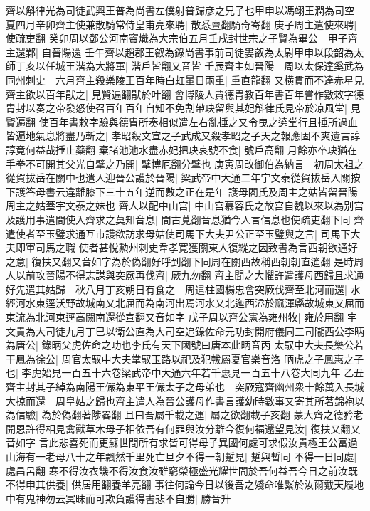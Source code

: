 齊以斛律光為司徒武興王普為尚書左僕射普歸彦之兄子也甲申以馮翊王潤為司空　夏四月辛卯齊主使兼散騎常侍皇甫亮來聘|{
	散悉亶翻騎奇寄翻}
庚子周主遣使來聘|{
	使疏吏翻}
癸卯周以鄧公河南竇熾為大宗伯五月壬戌封世宗之子賢為畢公　甲子齊主還鄴|{
	自晉陽還}
壬午齊以趙郡王叡為錄尚書事前司徒婁叡為太尉甲申以段韶為太師丁亥以任城王湝為大將軍|{
	湝戶皆翻又音皆}
壬辰齊主如晉陽　周以太保達奚武為同州刺史　六月齊主殺樂陵王百年時白虹暈日兩重|{
	重直龍翻}
又横貫而不達赤星見齊主欲以百年猒之|{
	見賢遍翻猒於叶翻}
會博陵人賈德胄教百年書百年嘗作數敕字德胄封以奏之帝發怒使召百年百年自知不免割帶玦留與其妃斛律氏見帝於凉風堂|{
	見賢遍翻}
使百年書敕字驗與德胄所奏相似遣左右亂捶之又令曳之遶堂行且捶所過血皆遍地氣息將盡乃斬之|{
	孝昭殺文宣之子武成又殺孝昭之子天之報應固不爽遺言諄諄竟何益哉捶止蘂翻}
棄諸池池水盡赤妃把玦哀號不食|{
	號戶高翻}
月餘亦卒玦猶在手拳不可開其父光自擘之乃開|{
	擘博厄翻分擘也}
庚寅周改御伯為納言　初周太祖之從賀拔岳在關中也遣人迎晉公護於晉陽|{
	梁武帝中大通二年宇文泰從賀拔岳入關按下護答母書云違離膝下三十五年逆而數之正在是年}
護母閻氏及周主之姑皆留晉陽|{
	周主之姑蓋宇文泰之妹也}
齊人以配中山宫|{
	中山宫慕容氏之故宫自魏以來以為别宫}
及護用事遣間使入齊求之莫知音息|{
	間古莧翻音息猶今人言信息也使疏吏翻下同}
齊遣使者至玉璧求通互市護欲訪求母姑使司馬下大夫尹公正至玉璧與之言|{
	司馬下大夫即軍司馬之職}
使者甚悅勲州刺史韋孝寛獲關東人復縱之因致書為言西朝欲通好之意|{
	復扶又翻又音如字為於偽翻好呼到翻下同周在關西故稱西朝朝直遙翻}
是時周人以前攻晉陽不得志謀與突厥再伐齊|{
	厥九勿翻}
齊主聞之大懼許遣護母西歸且求通好先遣其姑歸　秋八月丁亥朔日有食之　周遣柱國楊忠會突厥伐齊至北河而還|{
	水經河水東逕沃野故城南又北屈而為南河出焉河水又北迤西溢於窳渾縣故城東又屈而東流為北河東逕高闕南還從宣翻又音如字}
戊子周以齊公憲為雍州牧|{
	雍於用翻}
宇文貴為大司徒九月丁巳以衛公直為大司空追錄佐命元功封開府儀同三司隴西公李昞為唐公|{
	錄昞父虎佐命之功也李氏有天下國號曰唐本此昞音丙}
太馭中大夫長樂公若干鳳為徐公|{
	周官太馭中大夫掌馭玉路以祀及犯軷屬夏官樂音洛}
昞虎之子鳳惠之子也|{
	李虎始見一百五十六卷梁武帝中大通六年若千惠見一百五十八卷大同九年}
乙丑齊主封其子綽為南陽王儼為東平王儼太子之母弟也　突厥寇齊幽州衆十餘萬入長城大掠而還　周皇姑之歸也齊主遣人為晉公護母作書言護幼時數事又寄其所著錦袍以為信驗|{
	為於偽翻著陟畧翻}
且曰吾屬千載之運|{
	屬之欲翻載子亥翻}
蒙大齊之德矜老開恩許得相見禽獸草木母子相依吾有何罪與汝分離今復何福還望見汝|{
	復扶又翻又音如字}
言此悲喜死而更蘇世間所有求皆可得母子異國何處可求假汝貴極王公富過山海有一老母八十之年飄然千里死亡旦夕不得一朝蹔見|{
	蹔與暫同}
不得一日同處|{
	處昌呂翻}
寒不得汝衣饑不得汝食汝雖窮榮極盛光耀世間於吾何益吾今日之前汝既不得申其供養|{
	供居用翻養羊亮翻}
事往何論今日以後吾之殘命唯繫於汝爾戴天履地中有鬼神勿云冥昧而可欺負護得書悲不自勝|{
	勝音升}
